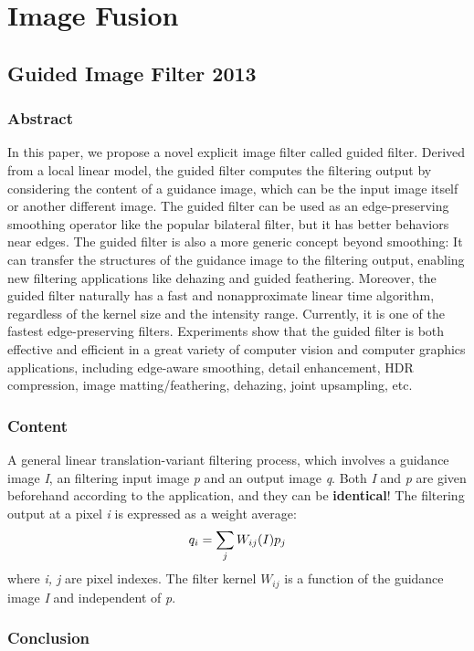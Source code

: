 \chapter{Image Fusion}
\section{Guided Image Filter 2013}
\subsection{Abstract}
In this paper, we propose a novel explicit image filter called guided filter. Derived from a local linear model, the guided filter
computes the filtering output by considering the content of a guidance image, which can be the input image itself or another different
image. The guided filter can be used as an edge-preserving smoothing operator like the popular bilateral filter, but it has better
behaviors near edges. The guided filter is also a more generic concept beyond smoothing: It can transfer the structures of the guidance
image to the filtering output, enabling new filtering applications like dehazing and guided feathering. Moreover, the guided filter
naturally has a fast and nonapproximate linear time algorithm, regardless of the kernel size and the intensity range. Currently, it is one
of the fastest edge-preserving filters. Experiments show that the guided filter is both effective and efficient in a great variety of
computer vision and computer graphics applications, including edge-aware smoothing, detail enhancement, HDR compression, image
matting/feathering, dehazing, joint upsampling, etc.
\subsection{Content}
A general linear translation-variant filtering process, which involves a guidance image \textit{I}, an filtering input image \textit{p} and an output image \textit{q}. Both \textit{I} and \textit{p} are given beforehand according to the application, and they can be \textbf{identical}! The filtering output at a pixel \textit{i} is expressed as a weight average:
\begin{equation}
\centering
q_i = \sum_{j}W_{ij}(I)p_j
\end{equation}
where \textit{i, j} are pixel indexes. The filter kernel \(W_{ij}\) is a function of the guidance image \textit{I} and independent of \textit{p}.
\subsection{Conclusion}

